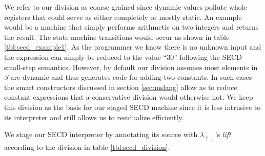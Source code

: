 \documentclass[a4paper,12pt,twoside,openright]{report}
\theoremstyle{definition}
\newcommand{\mslang}{$\lambda_{\uparrow\downarrow}$}
\begin{document}
We refer to our division as coarse grained since dynamic values pollute whole registers that could serve as either completely or mostly static. An example would be a machine that simply performs arithmetic on two integers and returns the result. The state machine transitions would occur as shown in table \ref{tbl:secd_example1}. As the programmer we know there is no unknown input and the expression can simply be reduced to the value ``30'' following the SECD small-step semantics. However, by default our division assumes most elements in \textit{S} are dynamic and thus generates code for adding two constants. In such cases the smart constructors discussed in section \ref{sec:mslang} allow as to reduce constant expressions that a conservative division would otherwise not. We keep this division as the basis for our staged SECD machine since it is less intrusive to its interpreter and still allows us to residualize efficiently.

We stage our SECD interpreter by annotating its source with \mslang's \textit{lift} according to the division in table \ref{tbl:secd_division}.
\end{document}
